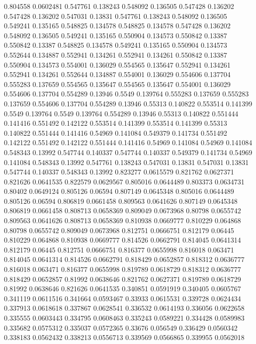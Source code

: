 0.804558 0.0602481
0.547761 0.138243
0.548092 0.136505
0.547428 0.136202
0.547428 0.136202
0.547031 0.13831
0.547761 0.138243
0.548092 0.136505
0.549241 0.135165
0.548825 0.134578
0.548825 0.134578
0.547428 0.136202
0.548092 0.136505
0.549241 0.135165
0.550904 0.134573
0.550842 0.13387
0.550842 0.13387
0.548825 0.134578
0.549241 0.135165
0.550904 0.134573
0.552644 0.134887
0.552941 0.134261
0.552941 0.134261
0.550842 0.13387
0.550904 0.134573
0.554001 0.136029
0.554565 0.135647
0.552941 0.134261
0.552941 0.134261
0.552644 0.134887
0.554001 0.136029
0.554606 0.137704
0.555283 0.137659
0.554565 0.135647
0.554565 0.135647
0.554001 0.136029
0.554606 0.137704
0.554289 0.13946
0.5549 0.139764
0.555283 0.137659
0.555283 0.137659
0.554606 0.137704
0.554289 0.13946
0.55313 0.140822
0.553514 0.141399
0.5549 0.139764
0.5549 0.139764
0.554289 0.13946
0.55313 0.140822
0.551444 0.141416
0.551492 0.142122
0.553514 0.141399
0.553514 0.141399
0.55313 0.140822
0.551444 0.141416
0.54969 0.141084
0.549379 0.141734
0.551492 0.142122
0.551492 0.142122
0.551444 0.141416
0.54969 0.141084
0.54969 0.141084
0.548343 0.13992
0.547744 0.140337
0.547744 0.140337
0.549379 0.141734
0.54969 0.141084
0.548343 0.13992
0.547761 0.138243
0.547031 0.13831
0.547031 0.13831
0.547744 0.140337
0.548343 0.13992
0.823277 0.0615579
0.821762 0.0627371
0.821626 0.0641535
0.822579 0.0629567
0.805016 0.0644489
0.803373 0.0634731
0.80402 0.0649124
0.805126 0.06594
0.807149 0.0645348
0.805016 0.0644489
0.805126 0.06594
0.806819 0.0661458
0.809563 0.0641626
0.807149 0.0645348
0.806819 0.0661458
0.808713 0.0658369
0.809049 0.0673968
0.80798 0.0655742
0.809563 0.0641626
0.808713 0.0658369
0.810938 0.0669777
0.810229 0.064868
0.80798 0.0655742
0.809049 0.0673968
0.812751 0.0666751
0.812179 0.06445
0.810229 0.064868
0.810938 0.0669777
0.814526 0.0662791
0.814045 0.0641314
0.812179 0.06445
0.812751 0.0666751
0.816377 0.0655998
0.816018 0.063471
0.814045 0.0641314
0.814526 0.0662791
0.818429 0.0652857
0.818312 0.0636777
0.816018 0.063471
0.816377 0.0655998
0.819789 0.0618729
0.818312 0.0636777
0.818429 0.0652857
0.81992 0.0638646
0.821762 0.0627371
0.819789 0.0618729
0.81992 0.0638646
0.821626 0.0641535
0.340851 0.0591919
0.340405 0.0605767
0.341119 0.0611516
0.341664 0.0593467
0.33933 0.0615531
0.339728 0.0624434
0.337913 0.0618618
0.337867 0.0628541
0.336532 0.0614193
0.336056 0.0622658
0.335555 0.0603443
0.334795 0.0608463
0.335243 0.0589221
0.334428 0.0589983
0.335682 0.0575312
0.335037 0.0572365
0.33676 0.056549
0.336429 0.0560342
0.338183 0.0562432
0.338213 0.0556713
0.339569 0.0566865
0.339955 0.0562018
